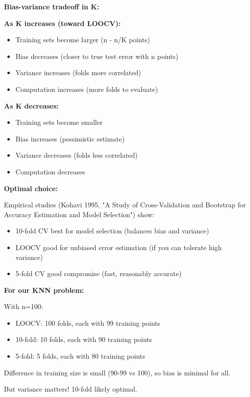 \documentclass[12pt]{article}
\begin{document}
\begin{explanation}
\textbf{Bias-variance tradeoff in K:}

\textbf{As K increases (toward LOOCV):}
\begin{itemize}
    \item Training sets become larger (n - n/K points)
    \item Bias decreases (closer to true test error with n points)
    \item Variance increases (folds more correlated)
    \item Computation increases (more folds to evaluate)
\end{itemize}

\textbf{As K decreases:}
\begin{itemize}
    \item Training sets become smaller
    \item Bias increases (pessimistic estimate)
    \item Variance decreases (folds less correlated)
    \item Computation decreases
\end{itemize}

\textbf{Optimal choice:}

Empirical studies (Kohavi 1995, "A Study of Cross-Validation and Bootstrap for Accuracy Estimation and Model Selection") show:

\begin{itemize}
    \item 10-fold CV best for model selection (balances bias and variance)
    \item LOOCV good for unbiased error estimation (if you can tolerate high variance)
    \item 5-fold CV good compromise (fast, reasonably accurate)
\end{itemize}

\textbf{For our KNN problem:}

With n=100:
\begin{itemize}
    \item LOOCV: 100 folds, each with 99 training points
    \item 10-fold: 10 folds, each with 90 training points
    \item 5-fold: 5 folds, each with 80 training points
\end{itemize}

Difference in training size is small (90-99 vs 100), so bias is minimal for all.

But variance matters! 10-fold likely optimal.


\end{explanation}
\end{document}

